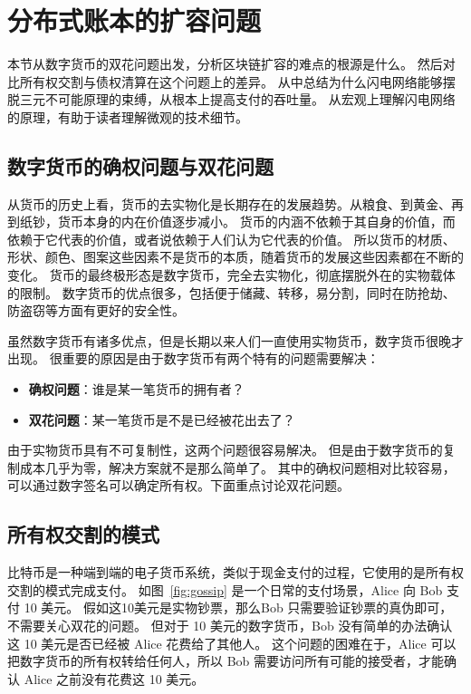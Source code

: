 \section{分布式账本的扩容问题}

本节从数字货币的双花问题出发，分析区块链扩容的难点的根源是什么。
然后对比所有权交割与债权清算在这个问题上的差异。
从中总结为什么闪电网络能够摆脱三元不可能原理的束缚，从根本上提高支付的吞吐量。
从宏观上理解闪电网络的原理，有助于读者理解微观的技术细节。

\subsection{数字货币的确权问题与双花问题}

从货币的历史上看，货币的去实物化是长期存在的发展趋势。从粮食、到黄金、再到纸钞，货币本身的内在价值逐步减小。
货币的内涵不依赖于其自身的价值，而依赖于它代表的价值，或者说依赖于人们认为它代表的价值。
所以货币的材质、形状、颜色、图案这些因素不是货币的本质，随着货币的发展这些因素都在不断的变化。
货币的最终极形态是数字货币，完全去实物化，彻底摆脱外在的实物载体的限制。
数字货币的优点很多，包括便于储藏、转移，易分割，同时在防抢劫、防盗窃等方面有更好的安全性。

虽然数字货币有诸多优点，但是长期以来人们一直使用实物货币，数字货币很晚才出现。
很重要的原因是由于数字货币有两个特有的问题需要解决：
\begin{itemize}
  \item \textbf{确权问题}：谁是某一笔货币的拥有者？
  \item \textbf{双花问题}：某一笔货币是不是已经被花出去了？
\end{itemize}

由于实物货币具有不可复制性，这两个问题很容易解决。
但是由于数字货币的复制成本几乎为零，解决方案就不是那么简单了。
其中的确权问题相对比较容易，可以通过数字签名可以确定所有权。下面重点讨论双花问题。

\subsection{所有权交割的模式}
比特币是一种端到端的电子货币系统，类似于现金支付的过程，它使用的是所有权交割的模式完成支付。
如图~\ref{fig:gossip} 是一个日常的支付场景，Alice 向 Bob 支付 10 美元。
假如这10美元是实物钞票，那么Bob 只需要验证钞票的真伪即可，不需要关心双花的问题。
但对于 10 美元的数字货币，Bob 没有简单的办法确认这 10 美元是否已经被 Alice 花费给了其他人。
这个问题的困难在于，Alice 可以把数字货币的所有权转给任何人，所以 Bob 需要访问所有可能的接受者，才能确认 Alice 之前没有花费这 10 美元。

